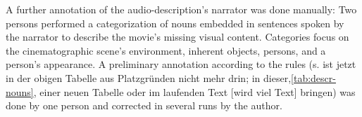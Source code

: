 \documentclass[10pt,a4paper,onecolumn]{article}
\begin{document}
A further annotation of the audio-description's narrator was done manually: Two
persons performed a categorization of nouns embedded in sentences spoken by the
narrator to describe the movie's missing visual content. Categories focus on the
cinematographic scene's environment, inherent objects, persons, and a person's
appearance. A preliminary annotation according to the rules (s. ist jetzt in der obigen Tabelle aus Platzgründen nicht mehr drin; in dieser,\ref{tab:descr-nouns}, einer neuen Tabelle oder im laufenden Text [wird viel Text] bringen) was done by one person and corrected in several runs by the author.
\end{document}
